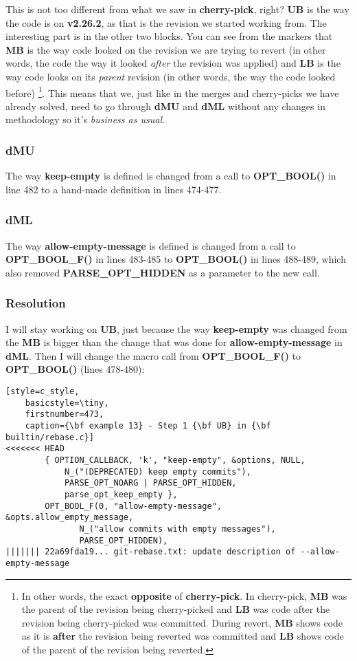 This is not too different from what we saw in {\bf cherry-pick}, right? {\bf UB} is the way the code is on {\bf v2.26.2}, as that is
the revision we started working from. The interesting part is in the other two blocks. You can see from the markers that {\bf MB}
is the way code looked on the revision we are trying to revert (in other words, the code the way it looked {\it after} the revision was
applied) and {\bf LB} is the way code looks on its {\it parent} revision (in other words, the way the code looked before)
\footnote{In other words, the exact {\bf opposite} of {\bf cherry-pick}. In cherry-pick, {\bf MB} was the parent of the revision
being cherry-picked and {\bf LB} was code after the revision being cherry-picked was committed. During revert, {\bf MB}
shows code as it is {\bf after} the revision being reverted was committed and {\bf LB} shows code of the parent of the revision
being reverted.}. This means that we, just like in the merges and cherry-picks we have already solved, need to go through {\bf dMU} and
{\bf dML} without any changes in methodology so it's {\it business as usual}.

\subsubsection{dMU}
The way {\bf keep-empty} is defined is changed from a call to {\bf OPT\_BOOL()} in line 482 to a hand-made definition in
lines 474-477.

\subsubsection{dML}
The way {\bf allow-empty-message} is defined is changed from a call to {\bf OPT\_BOOL\_F()} in lines 483-485 to
{\bf OPT\_BOOL()} in lines 488-489, which also removed {\bf PARSE\_OPT\_HIDDEN} as a parameter to the new call.

\subsubsection{Resolution}
I will stay working on {\bf UB}, just because the way {\bf keep-empty} was changed from the {\bf MB} is bigger than the
change that was done for {\bf allow-empty-message} in {\bf dML}. Then I will change the macro call from {\bf OPT\_BOOL\_F()}
to {\bf OPT\_BOOL()} (lines 478-480):

\begin{lstlisting}[style=c_style,
	basicstyle=\tiny,
	firstnumber=473,
	caption={\bf example 13} - Step 1 {\bf UB} in {\bf builtin/rebase.c}]
<<<<<<< HEAD
		{ OPTION_CALLBACK, 'k', "keep-empty", &options, NULL,
			N_("(DEPRECATED) keep empty commits"),
			PARSE_OPT_NOARG | PARSE_OPT_HIDDEN,
			parse_opt_keep_empty },
		OPT_BOOL_F(0, "allow-empty-message", &opts.allow_empty_message,
			   N_("allow commits with empty messages"),
			   PARSE_OPT_HIDDEN),
||||||| 22a69fda19... git-rebase.txt: update description of --allow-empty-message
\end{lstlisting}

